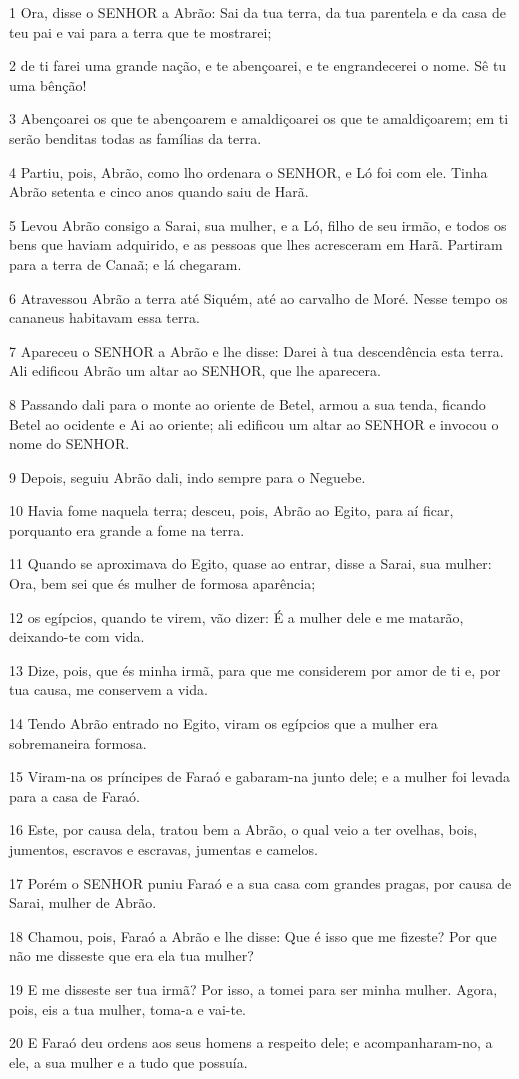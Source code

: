 \par 1 Ora, disse o SENHOR a Abrão: Sai da tua terra, da tua parentela e da casa de teu pai e vai para a terra que te mostrarei;
\par 2 de ti farei uma grande nação, e te abençoarei, e te engrandecerei o nome. Sê tu uma bênção!
\par 3 Abençoarei os que te abençoarem e amaldiçoarei os que te amaldiçoarem; em ti serão benditas todas as famílias da terra.
\par 4 Partiu, pois, Abrão, como lho ordenara o SENHOR, e Ló foi com ele. Tinha Abrão setenta e cinco anos quando saiu de Harã.
\par 5 Levou Abrão consigo a Sarai, sua mulher, e a Ló, filho de seu irmão, e todos os bens que haviam adquirido, e as pessoas que lhes acresceram em Harã. Partiram para a terra de Canaã; e lá chegaram.
\par 6 Atravessou Abrão a terra até Siquém, até ao carvalho de Moré. Nesse tempo os cananeus habitavam essa terra.
\par 7 Apareceu o SENHOR a Abrão e lhe disse: Darei à tua descendência esta terra. Ali edificou Abrão um altar ao SENHOR, que lhe aparecera.
\par 8 Passando dali para o monte ao oriente de Betel, armou a sua tenda, ficando Betel ao ocidente e Ai ao oriente; ali edificou um altar ao SENHOR e invocou o nome do SENHOR.
\par 9 Depois, seguiu Abrão dali, indo sempre para o Neguebe.
\par 10 Havia fome naquela terra; desceu, pois, Abrão ao Egito, para aí ficar, porquanto era grande a fome na terra.
\par 11 Quando se aproximava do Egito, quase ao entrar, disse a Sarai, sua mulher: Ora, bem sei que és mulher de formosa aparência;
\par 12 os egípcios, quando te virem, vão dizer: É a mulher dele e me matarão, deixando-te com vida.
\par 13 Dize, pois, que és minha irmã, para que me considerem por amor de ti e, por tua causa, me conservem a vida.
\par 14 Tendo Abrão entrado no Egito, viram os egípcios que a mulher era sobremaneira formosa.
\par 15 Viram-na os príncipes de Faraó e gabaram-na junto dele; e a mulher foi levada para a casa de Faraó.
\par 16 Este, por causa dela, tratou bem a Abrão, o qual veio a ter ovelhas, bois, jumentos, escravos e escravas, jumentas e camelos.
\par 17 Porém o SENHOR puniu Faraó e a sua casa com grandes pragas, por causa de Sarai, mulher de Abrão.
\par 18 Chamou, pois, Faraó a Abrão e lhe disse: Que é isso que me fizeste? Por que não me disseste que era ela tua mulher?
\par 19 E me disseste ser tua irmã? Por isso, a tomei para ser minha mulher. Agora, pois, eis a tua mulher, toma-a e vai-te.
\par 20 E Faraó deu ordens aos seus homens a respeito dele; e acompanharam-no, a ele, a sua mulher e a tudo que possuía.

